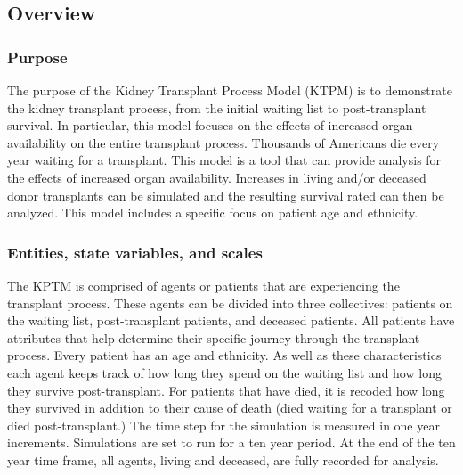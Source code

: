 \documentclass[9pt,a4paper,twocolumn]{scrartcl}
\begin{document}
\subsection{Overview}
\subsubsection{Purpose}
The purpose of the Kidney Transplant Process Model (KTPM) is to demonstrate the kidney transplant process, from the initial waiting list to post-transplant survival.  In particular, this model focuses on the effects of increased organ availability on the entire transplant process.  Thousands of Americans die every year waiting for a transplant.  This model is a tool that can provide analysis for the effects of increased organ availability.  Increases in living and/or deceased donor transplants can be simulated and the resulting survival rated can then be analyzed.  This model includes a specific focus on patient age and ethnicity.

\subsubsection{Entities, state variables, and scales}
The KPTM is comprised of agents or patients that are experiencing the transplant process.  These agents can be divided into three collectives: patients on the waiting list, post-transplant patients, and deceased patients.  All patients have attributes that help determine their specific journey through the transplant process.  Every patient has an age and ethnicity.  As well as these characteristics each agent keeps track of how long they spend on the waiting list and how long they survive post-transplant.  For patients that have died, it is recoded how long they survived in addition to their cause of death (died waiting for a transplant or died post-transplant.)
The time step for the simulation is measured in one year increments.  Simulations are set to run for a ten year period.  At the end of the ten year time frame, all agents, living and deceased, are fully recorded for analysis.
\end{document}
